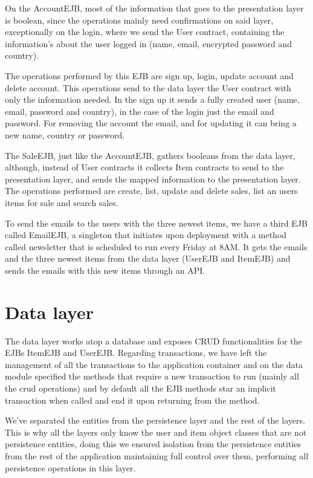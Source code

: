 \documentclass{article}
\begin{document}
\qquad On the AccountEJB, most of the information that goes to the presentation layer is boolean, since the operations mainly need confirmations on said layer, exceptionally on the login, where we send the User contract, containing the information's about the user logged in (name, email, encrypted password and country).

\qquad The operations performed by this \ac{EJB} are sign up, login, update account and delete account. This operations send to the data layer the User contract with only the information needed. In the sign up it sends a fully created user (name, email, password and country), in the case of the login just the email and password. For removing the account the email, and for updating it can bring a new name, country or password.

\qquad The SaleEJB, just like the AccountEJB, gathers booleans from the data layer, although, instead of User contracts it collects Item contracts to send to the presentation layer, and sends the mapped information to the presentation layer. The operations performed are create, list, update and delete sales, list an users items for sale and search sales. 

\qquad To send the emails to the users with the three newest items, we have a third \ac{EJB} called EmailEJB, a singleton that initiates upon deployment with a method called newsletter that is scheduled to run every Friday at 8AM. It gets the emails and the three newest items from the data layer (UserEJB and ItemEJB) and sends the emails with this new items through an API. 




\section{Data layer}

\qquad The data layer works atop a database and exposes CRUD functionalities for the \ac{EJB}s ItemEJB and UserEJB. Regarding transactions, we have left the management of all the transactions to the application container and on the data module specified the methods that require a new transaction to run  (mainly all the crud operations) and by default all the \ac{EJB} methods star an implicit transaction when called and end it upon returning from the method.

\qquad We've separated the entities from the persistence layer and the rest of the layers. This is why all the layers only know the user and item object classes that are not persistence entities, doing this we ensured isolation from the persistence entities from the rest of the application maintaining full control over them, performing all persistence operations in this layer.
\end{document}
